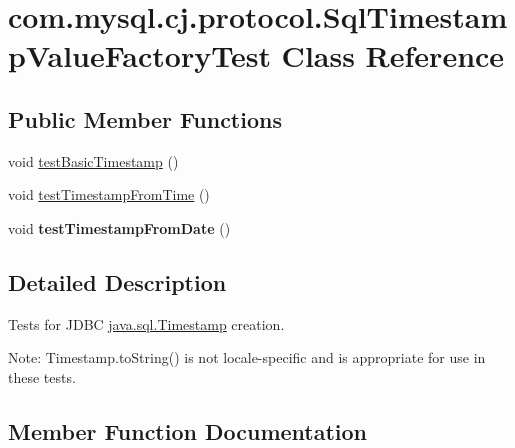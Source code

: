\hypertarget{classcom_1_1mysql_1_1cj_1_1protocol_1_1_sql_timestamp_value_factory_test}{}\section{com.\+mysql.\+cj.\+protocol.\+Sql\+Timestamp\+Value\+Factory\+Test Class Reference}
\label{classcom_1_1mysql_1_1cj_1_1protocol_1_1_sql_timestamp_value_factory_test}
\subsection*{Public Member Functions}
\begin{DoxyCompactItemize}
\item 
void \mbox{\hyperlink{classcom_1_1mysql_1_1cj_1_1protocol_1_1_sql_timestamp_value_factory_test_af3dc0852a4c5b40e00a9c3012c4cc6d2}{test\+Basic\+Timestamp}} ()
\item 
void \mbox{\hyperlink{classcom_1_1mysql_1_1cj_1_1protocol_1_1_sql_timestamp_value_factory_test_af0a7b6505656f7c53014d514682a37a3}{test\+Timestamp\+From\+Time}} ()
\item 
\mbox{\label{classcom_1_1mysql_1_1cj_1_1protocol_1_1_sql_timestamp_value_factory_test_a0150a88fa0b8af0a46ef34bef7b269d8}} 
void {\bfseries test\+Timestamp\+From\+Date} ()
\end{DoxyCompactItemize}


\subsection{Detailed Description}
Tests for J\+D\+BC \mbox{\hyperlink{}{java.\+sql.\+Timestamp}} creation. 

Note\+: Timestamp.\+to\+String() is not locale-\/specific and is appropriate for use in these tests. 

\subsection{Member Function Documentation}
\mbox{\label{classcom_1_1mysql_1_1cj_1_1protocol_1_1_sql_timestamp_value_factory_test_af3dc0852a4c5b40e00a9c3012c4cc6d2}} 
